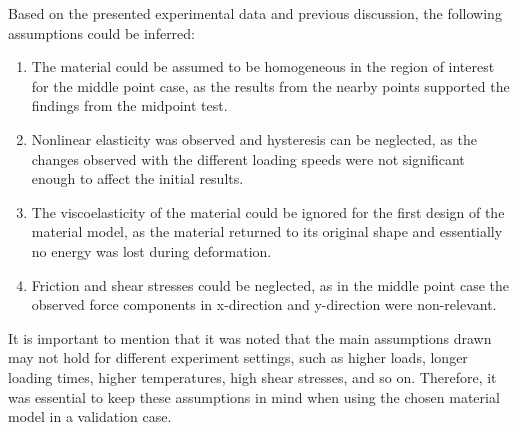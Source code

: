 Based on the presented experimental data and previous discussion, the following assumptions could be inferred:
\begin{enumerate}
    \item The material could be assumed to be homogeneous in the region of interest for the middle point case, as the results from the nearby points supported the findings from the midpoint test.
    \item Nonlinear elasticity was observed and hysteresis can be neglected, as the changes observed with the different loading speeds were not significant enough to affect the initial results.
    \item The viscoelasticity of the material could be ignored for the first design of the material model, as the material returned to its original shape and essentially no energy was lost during deformation. 
    \item Friction and shear stresses could be neglected, as in the middle point case the observed force components in x-direction and y-direction were non-relevant.
\end{enumerate}

It is important to mention that it was noted that the main assumptions drawn may not hold for different 
experiment settings, such as higher loads, longer loading times, higher temperatures, high shear stresses, and so on. 
Therefore, it was essential to keep these assumptions in mind when using the chosen material model in a validation case.  

